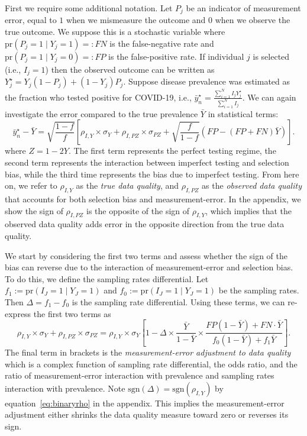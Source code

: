 \documentclass[aoas]{amsart}
\def\pr{\text{pr}}
\def\sgn{\text{sgn}}
\begin{document}
First we require some additional notation.  Let $P_j$ be an indicator of measurement error, equal to $1$ when we mismeasure the outcome and $0$ when we observe the true outcome. We suppose this is a stochastic variable where $\pr(P_j = 1 \mid Y_j = 1) =: FN$ is the false-negative rate and $\pr(P_j = 1 \mid Y_j = 0) =: FP$ is the false-positive rate.  If individual $j$ is selected (i.e., $I_j = 1$) then the observed outcome can be written as $Y_j^\star = Y_j(1-P_j) + (1-Y_j) P_j$.  Suppose disease prevalence was estimated as the fraction who tested positive for COVID-19, i.e., $\bar y_n^\star = \frac{\sum_{i=1}^N I_j Y_j^\star}{\sum_{i=1}^N I_j}$.  We can again investigate the error compared to the true prevalence $\bar Y$ in statistical terms:
$$
\bar y_n^\star - \bar Y = \sqrt{\frac{1-f}{f}} \left[ \rho_{I,Y} \times \sigma_Y + \rho_{I,PZ} \times \sigma_{PZ} + \sqrt{\frac{f}{1-f}}  \left( FP - (FP+FN) \bar Y \right) \right] .
$$
where $Z = 1-2Y$. The first term represents the perfect testing regime, the second term represents the interaction between imperfect testing and selection bias, while the third time represents the bias due to imperfect testing.  From here on, we refer to $\rho_{I,Y}$ as the \emph{true data quality}, and $\rho_{I,PZ}$ as the \emph{observed data quality} that accounts for both selection bias and measurement-error.  In the appendix, we show the sign of $\rho_{I,PZ}$ is the opposite of the sign of $\rho_{I,Y}$, which implies that the observed data quality adds error in the opposite direction from the true data quality.

We start by considering the first two terms and assess whether the sign of the bias can reverse due to the interaction of measurement-error and selection bias.  To do this, we define the sampling rates differential.  Let $f_1 := \pr (I_J = 1 \mid Y_J = 1)$ and $f_0 := \pr(I_J = 1 \mid Y_J = 1)$ be the sampling rates.  Then $\Delta = f_1 - f_0$ is the sampling rate differential.  Using these terms, we can re-express the first two terms as
$$
\rho_{I,Y} \times \sigma_Y + \rho_{I,PZ} \times \sigma_{PZ} =
\rho_{I,Y} \times \sigma_Y \left[ 1 - \Delta \times \frac{\bar Y}{1-\bar Y} \times \frac{FP(1-\bar Y) + FN \cdot \bar Y}{f_0 (1-\bar Y) + f_1 \bar Y} \right].
$$
The final term in brackets is the \emph{measurement-error adjustment to data quality} which is a complex function of sampling rate differential, the odds ratio, and the ratio of measurement-error interaction with prevalence and sampling rates interaction with prevalence. Note $\sgn(\Delta) = \sgn(\rho_{I,Y})$ by equation~\ref{eq:binaryrho} in the appendix.  This implies the measurement-error adjustment either shrinks the data quality measure toward zero or reverses its sign.
\end{document}
